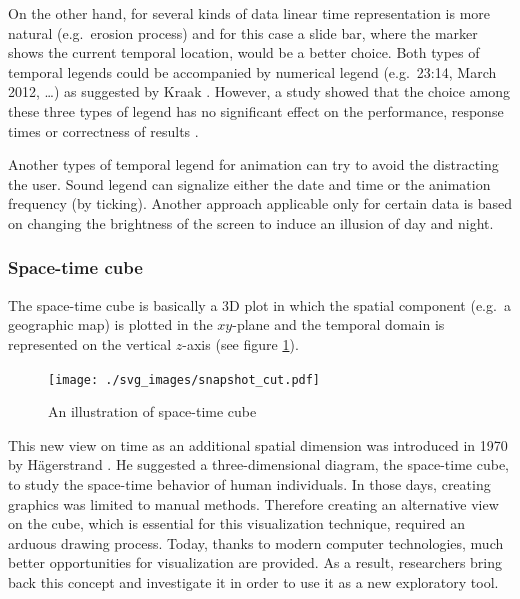 \documentclass[a4paper,12pt,oneside]{book}
\begin{document}
On the other hand, for several kinds of data linear time representation is more natural (e.g.\ erosion process)
and for this case a slide bar, where the marker shows the current temporal location, would be a better choice.
Both types of temporal legends could be accompanied by numerical legend (e.g.\ 23:14,  March 2012, \ldots)
as suggested by Kraak \cite{kraak1997cartographic}.
However, a study showed that the choice among these three types of legend has no significant effect on
the performance, response times or correctness of results \cite{edsall1997assessing}.

Another types of temporal legend for animation can try to avoid the distracting the user.
Sound legend can signalize either the date and time or the animation frequency (by ticking).
Another approach applicable only for certain data is based on changing the brightness of the screen
to induce an illusion of day and night.


\subsubsection{Space-time cube}
\label{sec:stcube}
The space-time cube is basically a 3D plot in which the spatial component (e.g.\ a geographic map)
is plotted in the $xy$\nobreakdash-plane and the temporal domain is represented
on the vertical $z$-axis (see figure \ref{fig:stcube_cut}).

\begin{figure}[h!]
  \centering
  \texttt{[image: ./svg\_images/snapshot\_cut.pdf]}
  \caption{An illustration of space-time cube}
  \label{fig:stcube_cut}
\end{figure}

This new view on time as an additional spatial dimension was introduced in 1970 by Hägerstrand \cite{hagerstrand1970}.
He suggested a three-dimensional diagram, the space-time cube, to study the space-time behavior of human individuals.
In those days, creating graphics was limited to manual methods.
Therefore creating an alternative view on the cube, which is essential for this visualization technique,
required an arduous drawing process. Today, thanks to modern computer technologies, much better opportunities
for visualization are provided. As a result, researchers bring back this concept and
investigate it in order to use it as a new exploratory tool.
\end{document}
